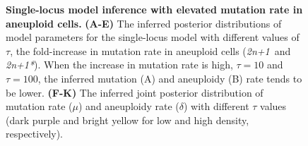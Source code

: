 \documentclass[12pt]{extarticle}
\newcommand{\anwt}{\emph{2n+1}}
\newcommand{\anmt}{\emph{2n+1*}}
\begin{document}
\begin{figure}[h!]
\begin{subfigure}{0.325\textwidth}
  \end{subfigure}
  \caption{
    \textbf{Single-locus model inference with elevated mutation rate in aneuploid cells.}  \textbf{(A-E)} The inferred posterior distributions of model parameters for the single-locus model with different values of $\tau$, the fold-increase in mutation rate in aneuploid cells (\anwt\ and \anmt). When the increase in mutation rate is high, $\tau=10$ and $\tau=100$, the inferred mutation (A) and aneuploidy (B) rate tends to be lower. 
    \textbf{(F-K)} The inferred joint posterior distribution of mutation rate ($\mu$) and aneuploidy rate ($\delta$) with different $\tau$ values (dark purple and bright yellow for low and high density, respectively).
  \label{fig:tau}
  }
  
  \end{figure}
\end{document}
